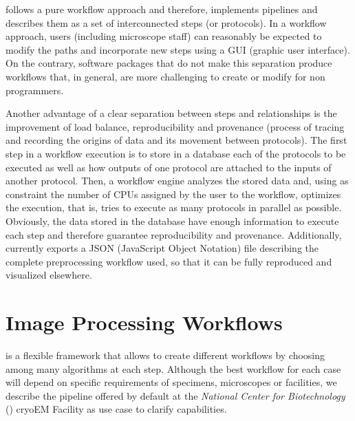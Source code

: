 \scipion follows a pure workflow approach and therefore, implements pipelines and describes them as a set of interconnected steps (or protocols). In a workflow approach, users (including microscope staff) can reasonably be expected to modify the paths and incorporate new steps using a GUI (graphic user interface). On the contrary, software packages that do not make this separation produce workflows that, in general, are more challenging to create or modify for non programmers. 

Another advantage of a clear separation between steps and relationships 
is the improvement of load balance, reproducibility and  provenance (process of tracing and recording the origins of data and its movement between protocols). The first step in a \scipion workflow execution
is to store in a database each of the protocols to be executed as well as how 
outputs of one protocol are attached to the inputs of another protocol. Then, a workflow engine analyzes the stored data and, using as constraint the number of CPUs assigned by the user to the workflow, optimizes the execution, that is, tries to execute as many protocols in parallel as possible. Obviously, the data stored in the database  have enough information to execute each step and therefore guarantee reproducibility and provenance. Additionally, \scipion currently exports a JSON (JavaScript Object Notation) file describing the complete preprocessing workflow used, so that it can be fully reproduced and visualized elsewhere.



\section{Image Processing Workflows}

\scipion is a flexible framework that allows to create different workflows by choosing among many algorithms at each step. Although the best workflow for each case will depend on specific requirements of specimens, microscopes or facilities, we  describe the pipeline offered by default at the \emph{National Center for Biotechnology} (\cnb) cryoEM Facility as use case to clarify \scipion capabilities.

